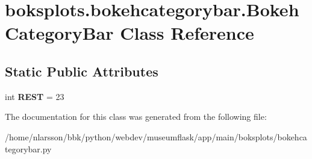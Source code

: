 \hypertarget{classboksplots_1_1bokehcategorybar_1_1BokehCategoryBar}{}\section{boksplots.\+bokehcategorybar.\+Bokeh\+Category\+Bar Class Reference}
\label{classboksplots_1_1bokehcategorybar_1_1BokehCategoryBar}
\subsection*{Static Public Attributes}
\begin{DoxyCompactItemize}
\item 
\mbox{\label{classboksplots_1_1bokehcategorybar_1_1BokehCategoryBar_a372bc0ad2b3be0321111623e32f26d9c}} 
int {\bfseries R\+E\+ST} = 23
\end{DoxyCompactItemize}


The documentation for this class was generated from the following file\+:\begin{DoxyCompactItemize}
\item 
/home/nlarsson/bbk/python/webdev/museumflask/app/main/boksplots/bokehcategorybar.\+py\end{DoxyCompactItemize}
